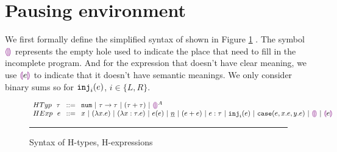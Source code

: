 \section{Pausing environment}
\label{sec:pause}

We first formally define the simplified syntax of \Hazel shown in Figure \ref{fig:syntax} \cite{HazelLive}. The symbol $\textcolor{violet}{\llparenthesis}\textcolor{violet}{\rrparenthesis}$ represents the empty hole used to indicate the place that need to fill in the incomplete program. And for the expression that doesn't have clear meaning, we use $\textcolor{violet}{\llparenthesis} e \textcolor{violet}{\rrparenthesis}$ to indicate that it doesn't have semantic meanings. We only consider binary sums so for $\mathtt{inj}_{i}({e})$,  $i \in \{L, R\}$.

\begin{figure}[htbp]
    \vspace{-3px} 
  $\arraycolsep=4pt\begin{array}{lll}
  HTyp~~ \tau & ::= &
    \tnum  ~\vert~
    \tarr{\tau}{\tau} ~\vert~
    (\tau + \tau) ~\vert~
    \ehole^A
    \\
  HExp~~ e & ::= &
    x ~\vert~
    \lamfunc{x}{e} ~\vert~
    \lamfunc{x:\tau}{e} ~\vert~
    e(e) ~\vert~
    \underlinenum{n} ~\vert~
    (e+e) ~\vert~
    e: \tau ~\vert~
    \hinj{i}{e} ~\vert~
    \hcase{e}{x}{e}{y}{e}~\vert~
    \ehole  ~\vert~
    \notehole{e} 
  \end{array}$
  \hrule
  \caption{Syntax of H-types, H-expressions}
    \label{fig:syntax}
    \vspace{-5px}
\end{figure}

